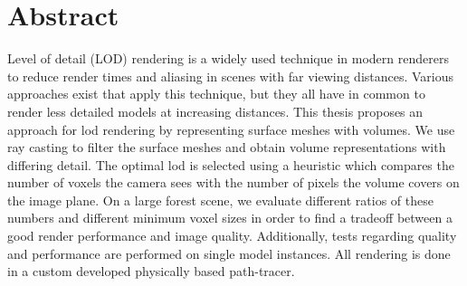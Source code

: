 \chapter*{Abstract}
Level of detail (LOD) rendering is a widely used technique in modern renderers to reduce render times and aliasing in scenes with far viewing distances.
Various approaches exist that apply this technique, but they all have in common to render less detailed models at increasing distances.
This thesis proposes an approach for \acs{lod} rendering by representing surface meshes with volumes.
We use ray casting to filter the surface meshes and obtain volume representations with differing detail.
The optimal \ac{lod} is selected using a heuristic which compares the number of voxels the camera sees with the number of pixels the volume covers on the image plane.
On a large forest scene, we evaluate different ratios of these numbers and different minimum voxel sizes in order to find a tradeoff between a good render performance and image quality.
Additionally, tests regarding quality and performance are performed on single model instances.
All rendering is done in a custom developed physically based path-tracer.